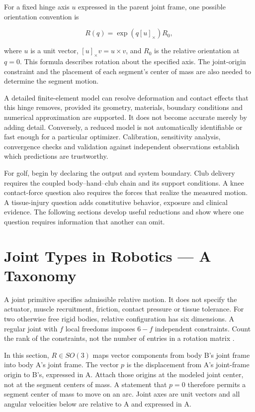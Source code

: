 For a fixed hinge axis \(u\) expressed in the parent joint frame, one possible orientation convention is

\[
R(q)=\exp(q[u]_\times)R_0,
\]

where \(u\) is a unit vector, \([u]_\times v=u\times v\), and \(R_0\) is the relative orientation at \(q=0\). This formula describes rotation about the specified axis. The joint-origin constraint and the placement of each segment's center of mass are also needed to determine the segment motion.

A detailed finite-element model can resolve deformation and contact effects that this hinge removes, provided its geometry, materials, boundary conditions and numerical approximation are supported. It does not become accurate merely by adding detail. Conversely, a reduced model is not automatically identifiable or fast enough for a particular optimizer. Calibration, sensitivity analysis, convergence checks and validation against independent observations establish which predictions are trustworthy.

For golf, begin by declaring the output and system boundary. Club delivery requires the coupled body--hand--club chain and its support conditions. A knee contact-force question also requires the forces that realize the measured motion. A tissue-injury question adds constitutive behavior, exposure and clinical evidence. The following sections develop useful reductions and show where one question requires information that another can omit.
\section{Joint Types in Robotics --- A Taxonomy}\label{sec-joint_types}\label{sec:joint_types}

A joint primitive specifies admissible relative motion. It does not specify the actuator, muscle recruitment, friction, contact pressure or tissue tolerance. For two otherwise free rigid bodies, relative configuration has six dimensions. A regular joint with \(f\) local freedoms imposes \(6-f\) independent constraints. Count the rank of the constraints, not the number of entries in a rotation matrix \citep{Lynch2017}.

In this section, \(R\in SO(3)\) maps vector components from body B's joint frame into body A's joint frame. The vector \(p\) is the displacement from A's joint-frame origin to B's, expressed in A. Attach those origins at the modeled joint center, not at the segment centers of mass. A statement that \(p=0\) therefore permits a segment center of mass to move on an arc. Joint axes are unit vectors and all angular velocities below are relative to A and expressed in A.


